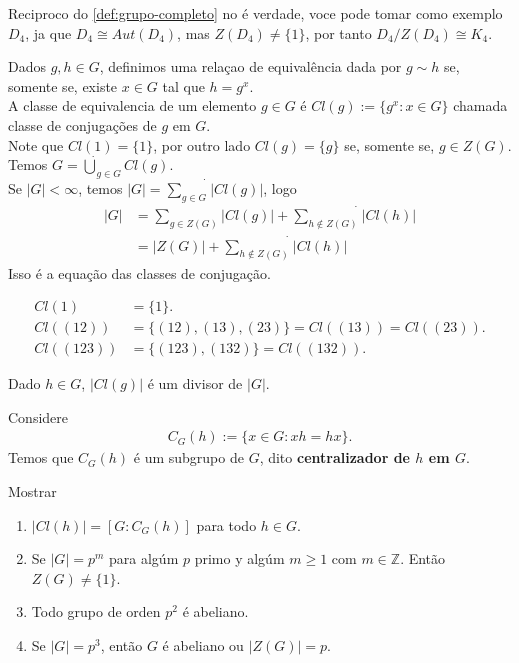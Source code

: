   \begin{note}
    Reciproco do \ref{def:grupo-completo} no é verdade, voce pode tomar como exemplo $D_4$, ja que $D_4\cong Aut(D_4)$, mas $Z(D_4)\neq \{1\}$, por tanto $D_4/Z(D_4)\cong K_4$.
  \end{note}
  \begin{definition}
    Dados $g,h\in G$, definimos uma relaçao de equivalência dada por $g\sim h$ se, somente se, existe $x\in G$ tal que $h=g^{x}$.\\
    A classe de equivalencia de um elemento $g\in G$ é $Cl(g):=\{g^{x}:x\in G\}$ chamada classe de conjugações de $g$ em $G$.\\ 
    Note que $Cl(1)=\{1\}$, por outro lado $Cl(g)=\{g\}$ se, somente se, $g\in Z(G)$.\\
    Temos $\displaystyle G=\dot{\bigcup}_{g\in G}Cl(g)$.\\
    Se $|G|<\infty$, temos $|G|=\dot{\sum_{g\in G}}|Cl(g)|$, logo
    \begin{align*}
      |G|&=\sum_{g\in Z(G)}|Cl(g)|+\dot{\sum_{h\notin Z(G)}}|Cl(h)|\\
      &=|Z(G)|+\dot{\sum_{h\notin Z(G)}}|Cl(h)|
    \end{align*}
    Isso é a equação das classes de conjugação.
  \end{definition}
  \begin{example}
    \begin{align*}
      Cl(1)&=\{1\}.\\
      Cl((12))&=\{(12),(13),(23)\}=Cl((13))=Cl((23)).\\
      Cl((123))&=\{(123),(132)\}=Cl((132)).
    \end{align*}
  \end{example}
  \begin{proposition}
    Dado $h\in G$, $|Cl(g)|$ é um divisor de $|G|$.
  \end{proposition}
  \begin{definition}[Centralizador de $h$ em $G$]
    Considere
    \begin{align*}
      C_G(h):=\{x\in G: xh=hx\}.
    \end{align*}
    Temos que $C_G(h)$ é um subgrupo de $G$, dito \textbf{centralizador de $h$ em $G$}. 
  \end{definition}
  Mostrar
  \begin{enumerate}
    \item $|Cl(h)|=[G:C_G(h)]$ para todo $h\in G$.
    \item Se $|G|=p^{m}$ para algúm $p$ primo y algúm $m\geq 1$ com $m\in\mathbb{Z}$. Então $Z(G)\neq \{1\}$.
    \item Todo grupo de orden $p^{2}$ é abeliano.
    \item Se $|G|=p^{3}$, então $G$ é abeliano ou $|Z(G)|=p$. 
  \end{enumerate}
